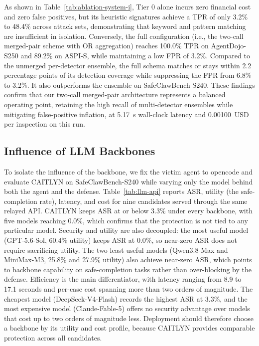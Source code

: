 As shown in Table~\ref{tab:ablation-system-i}, Tier 0 alone incurs
zero financial cost and zero false positives, but its heuristic
signatures achieve a TPR of only 3.2\% to 48.4\% across attack sets,
demonstrating that keyword and pattern matching are insufficient in
isolation.
Conversely, the full configuration (i.e., the two-call merged-pair
scheme with OR aggregation) reaches 100.0\% TPR on AgentDojo-S250 and
89.2\% on ASPI-S, while maintaining a low FPR of 3.2\%. Compared to
the unmerged per-detector ensemble, the full schema matches or stays
within 2.2 percentage points of its detection coverage while
suppressing the FPR from 6.8\% to 3.2\%. It also outperforms
the ensemble on SafeClawBench-S240. These findings confirm that our
two-call merged-pair architecture represents a balanced operating
point, retaining the high recall of multi-detector ensembles while
mitigating false-positive inflation, at 5.17~s wall-clock latency and
0.00100~USD per inspection on this run.


\subsection{Influence of LLM Backbones}

To isolate the influence of the backbone, we fix the victim agent to
opencode and evaluate CAITLYN on SafeClawBench-S240 while varying only
the model behind both the agent and the defense.
Table~\ref{tab:llm-api} reports ASR, utility (the safe-completion
rate), latency, and cost for nine candidates served through the same
relayed API. CAITLYN keeps ASR at or below 3.3\% under every backbone,
with five models reaching 0.0\%, which confirms that the protection is
not tied to any particular model. Security and utility are also
decoupled: the most useful model (GPT-5.6-Sol, 60.4\% utility) keeps
ASR at 0.0\%, so near-zero ASR does not require sacrificing utility.
The two least useful models (Qwen3.8-Max and MiniMax-M3, 25.8\% and
27.9\% utility) also achieve near-zero ASR, which points to backbone
capability on safe-completion tasks rather than over-blocking by the
defense. Efficiency is the main differentiator, with latency ranging
from 8.9 to 17.1 seconds and per-case cost spanning more than two
orders of magnitude. The cheapest model (DeepSeek-V4-Flash) records
the highest ASR at 3.3\%, and the most expensive model
(Claude-Fable-5) offers no security advantage over models that cost up
to two orders of magnitude less. Deployment should therefore choose a
backbone by its utility and cost profile, because CAITLYN provides
comparable protection across all candidates.


